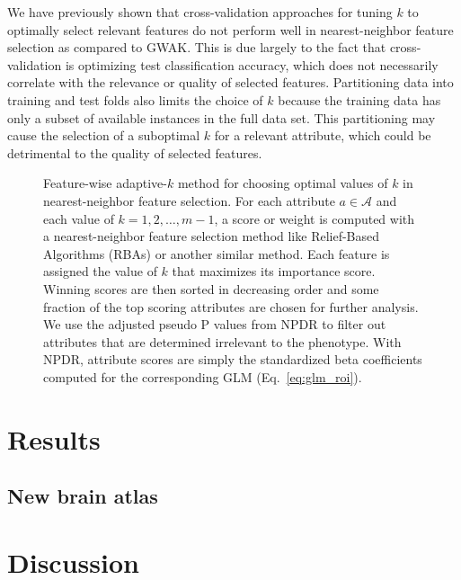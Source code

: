 \documentclass[10pt,letterpaper]{article}\usepackage[]{graphicx}\usepackage[]{color}
\begin{document}
We have previously shown that cross-validation approaches for tuning $k$ to optimally select relevant features do not perform well in nearest-neighbor feature selection as compared to GWAK. This is due largely to the fact that cross-validation is optimizing test classification accuracy, which does not necessarily correlate with the relevance or quality of selected features. Partitioning data into training and test folds also limits the choice of $k$ because the training data has only a subset of available instances in the full data set. This partitioning may cause the selection of a suboptimal $k$ for a relevant attribute, which could be detrimental to the quality of selected features.

\begin{figure}[h!]
	\centering
	\caption{Feature-wise adaptive-$k$ method for choosing optimal values of $k$ in nearest-neighbor feature selection. For each attribute $a \in \mathcal{A}$ and each value of $k=1,2,\dots,m-1$, a score or weight is computed with a nearest-neighbor feature selection method like Relief-Based Algorithms (RBAs) or another similar method. Each feature is assigned the value of $k$ that maximizes its importance score. Winning scores are then sorted in decreasing order and some fraction of the top scoring attributes are chosen for further analysis. We use the adjusted pseudo P values from NPDR to filter out attributes that are determined irrelevant to the phenotype. With NPDR, attribute scores are simply the standardized beta coefficients computed for the corresponding GLM (Eq.~\ref{eq:glm_roi}).}\label{fig:gwak}
\end{figure}

\section{Results}

\subsection{New brain atlas}

\section{Discussion}


\end{document}
